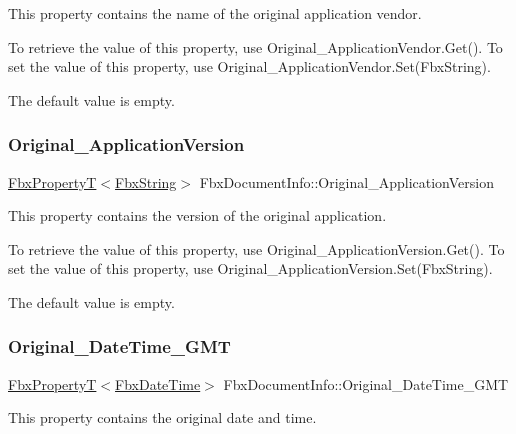 This property contains the name of the original application vendor.

To retrieve the value of this property, use Original\+\_\+\+Application\+Vendor.\+Get(). To set the value of this property, use Original\+\_\+\+Application\+Vendor.\+Set(\+Fbx\+String).

The default value is empty. \mbox{\label{class_fbx_document_info_ab995992091af994047deccc609f1bcfd}} 
\subsubsection{\texorpdfstring{Original\+\_\+\+Application\+Version}{Original\_ApplicationVersion}}
{\footnotesize\ttfamily \hyperlink{class_fbx_property_t}{Fbx\+PropertyT}$<$\hyperlink{class_fbx_string}{Fbx\+String}$>$ Fbx\+Document\+Info\+::\+Original\+\_\+\+Application\+Version}

This property contains the version of the original application.

To retrieve the value of this property, use Original\+\_\+\+Application\+Version.\+Get(). To set the value of this property, use Original\+\_\+\+Application\+Version.\+Set(\+Fbx\+String).

The default value is empty. \mbox{\label{class_fbx_document_info_adbfedbef249bc1ef77e06ad01e5067c6}} 
\subsubsection{\texorpdfstring{Original\+\_\+\+Date\+Time\+\_\+\+G\+MT}{Original\_DateTime\_GMT}}
{\footnotesize\ttfamily \hyperlink{class_fbx_property_t}{Fbx\+PropertyT}$<$\hyperlink{class_fbx_date_time}{Fbx\+Date\+Time}$>$ Fbx\+Document\+Info\+::\+Original\+\_\+\+Date\+Time\+\_\+\+G\+MT}

This property contains the original date and time.

